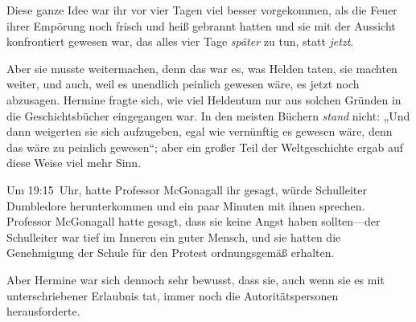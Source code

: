 Diese ganze Idee war ihr vor vier Tagen viel besser vorgekommen, als die Feuer ihrer Empörung noch frisch und heiß gebrannt hatten und sie mit der Aussicht konfrontiert gewesen war, das alles vier Tage \emph{später} zu tun, statt \emph{jetzt}.

Aber sie musste weitermachen, denn das war es, was Helden taten, sie machten weiter, und auch, weil es unendlich peinlich gewesen wäre, es jetzt noch abzusagen. Hermine fragte sich, wie viel Heldentum nur aus solchen Gründen in die Geschichtsbücher eingegangen war. In den meisten Büchern \emph{stand} nicht: „Und dann weigerten sie sich aufzugeben, egal wie vernünftig es gewesen wäre, denn das wäre zu peinlich gewesen“; aber ein großer Teil der Weltgeschichte ergab auf diese Weise viel mehr Sinn.

Um 19:15~Uhr, hatte Professor McGonagall ihr gesagt, würde Schulleiter Dumbledore herunterkommen und ein paar Minuten mit ihnen sprechen. Professor McGonagall hatte gesagt, dass sie keine Angst haben sollten—der Schulleiter war tief im Inneren ein guter Mensch, und sie hatten die Genehmigung der Schule für den Protest ordnungsgemäß erhalten.

Aber Hermine war sich dennoch sehr bewusst, dass sie, auch wenn sie es mit unterschriebener Erlaubnis tat, immer noch die Autoritätspersonen herausforderte.

